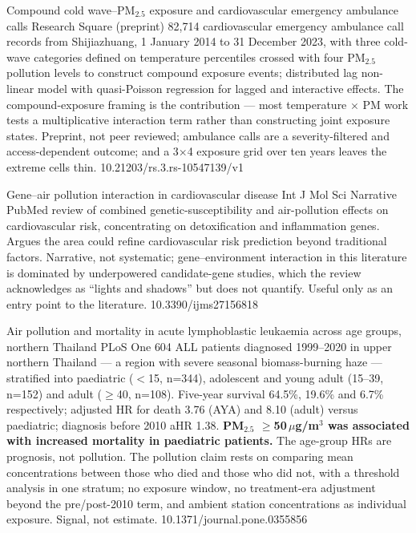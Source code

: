 \documentclass[10pt]{article}
\begin{document}
\clearpage


{Compound cold wave--PM$_{2.5}$ exposure and cardiovascular emergency ambulance calls}
{Research Square (preprint)}
{82{,}714 cardiovascular emergency ambulance call records from Shijiazhuang, 1 January
2014 to 31 December 2023, with three cold-wave categories defined on temperature
percentiles crossed with four PM$_{2.5}$ pollution levels to construct compound exposure
events; distributed lag non-linear model with quasi-Poisson regression for lagged and
interactive effects. The compound-exposure framing is the contribution --- most
temperature $\times$ PM work tests a multiplicative interaction term rather than
constructing joint exposure states. Preprint, not peer reviewed; ambulance calls are a
severity-filtered and access-dependent outcome; and a 3$\times$4 exposure grid over ten
years leaves the extreme cells thin.}
{10.21203/rs.3.rs-10547139/v1}

{Gene--air pollution interaction in cardiovascular disease}
{Int J Mol Sci}
{Narrative PubMed review of combined genetic-susceptibility and air-pollution effects on
cardiovascular risk, concentrating on detoxification and inflammation genes. Argues the
area could refine cardiovascular risk prediction beyond traditional factors. Narrative,
not systematic; gene--environment interaction in this literature is dominated by
underpowered candidate-gene studies, which the review acknowledges as ``lights and
shadows'' but does not quantify. Useful only as an entry point to the literature.}
{10.3390/ijms27156818}


{Air pollution and mortality in acute lymphoblastic leukaemia across age groups, northern Thailand}
{PLoS One}
{604 ALL patients diagnosed 1999--2020 in upper northern Thailand --- a region with severe
seasonal biomass-burning haze --- stratified into paediatric ($<$15, n=344), adolescent and
young adult (15--39, n=152) and adult ($\geq$40, n=108). Five-year survival 64.5\%,
19.6\% and 6.7\% respectively; adjusted HR for death 3.76 (AYA) and 8.10 (adult) versus
paediatric; diagnosis before 2010 aHR 1.38. \textbf{PM$_{2.5}$ $\geq$50\,$\mu$g/m$^3$ was
associated with increased mortality in paediatric patients.} The age-group HRs are
prognosis, not pollution. The pollution claim rests on comparing mean concentrations
between those who died and those who did not, with a threshold analysis in one stratum;
no exposure window, no treatment-era adjustment beyond the pre/post-2010 term, and
ambient station concentrations as individual exposure. Signal, not estimate.}
{10.1371/journal.pone.0355856}
\end{document}
